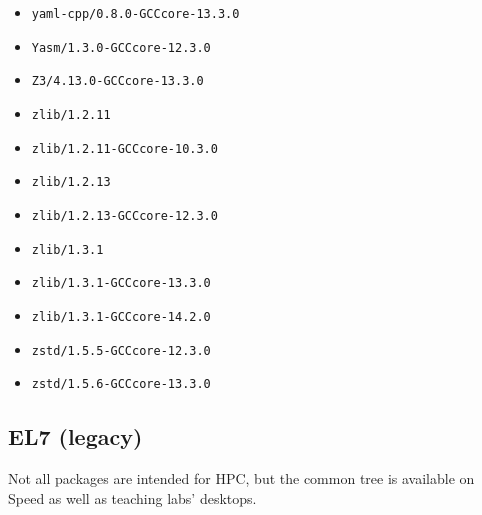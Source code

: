 \begin{multicols}{3}
\begin{itemize}
\item \verb|yaml-cpp/0.8.0-GCCcore-13.3.0|
\item \verb|Yasm/1.3.0-GCCcore-12.3.0|
\item \verb|Z3/4.13.0-GCCcore-13.3.0|
\item \verb|zlib/1.2.11|
\item \verb|zlib/1.2.11-GCCcore-10.3.0|
\item \verb|zlib/1.2.13|
\item \verb|zlib/1.2.13-GCCcore-12.3.0|
\item \verb|zlib/1.3.1|
\item \verb|zlib/1.3.1-GCCcore-13.3.0|
\item \verb|zlib/1.3.1-GCCcore-14.2.0|
\item \verb|zstd/1.5.5-GCCcore-12.3.0|
\item \verb|zstd/1.5.6-GCCcore-13.3.0|
\end{itemize}
\end{multicols}
\normalsize

\subsection{EL7 (legacy)}
\label{sect:software-el7}

Not all packages are intended for HPC, but the common tree is available
on Speed as well as teaching labs' desktops.

